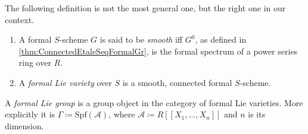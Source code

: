 \noindent
The following definition is not the most general one, but
the right one in our context.
\begin{defn}\leavevmode\vspace{-1\baselineskip}
\begin{enumerate}
	\item A formal $S$-scheme $G$ is said to be {\em smooth} iff
		$G^0$, as defined in \cref{thm:ConnectedEtaleSeqFormalGr},
		is the formal spectrum of a power series ring over $R$.
	\item A {\em formal Lie variety} over $S$ is a smooth, connected formal $S$-scheme.
\end{enumerate}
\end{defn}


\begin{defn}\label{defn:FormalSchemeFormalLieGroup}
	A {\em formal Lie group} is a group object in the category of
	formal Lie varieties.
	More explicitly it is $\Gamma \coloneqq \mathrm{Spf}\left( \mathscr{A} \right)$,
	where $\mathscr{A} \coloneqq R [\![ X_1, \ldots, X_{ n } ]\!]$
	and $n$ is its dimension. 
\end{defn}


